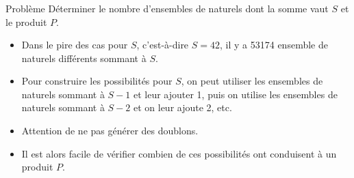 \begin{frame}
    \frametitle{\problemtitle}
    \begin{block}{Problème}
        Déterminer le nombre d'ensembles de naturels dont la somme vaut $S$ et le produit $P$.
    \end{block}
    \pause
    \begin{itemize}[<+->]
        \item Dans le pire des cas pour $S$, c'est-à-dire $S=42$, il y a        53174 ensemble de naturels différents sommant à $S$. \item<+-> Pour construire les possibilités pour $S$, on peut utiliser les ensembles de naturels sommant à $S-1$ et leur ajouter 1, puis on utilise les ensembles de naturels sommant à $S-2$ et on leur ajoute 2, etc.
        \item Attention de ne pas générer des doublons.
        \item Il est alors facile de vérifier combien de ces possibilités ont conduisent à un produit $P$.
    \end{itemize}

\end{frame}